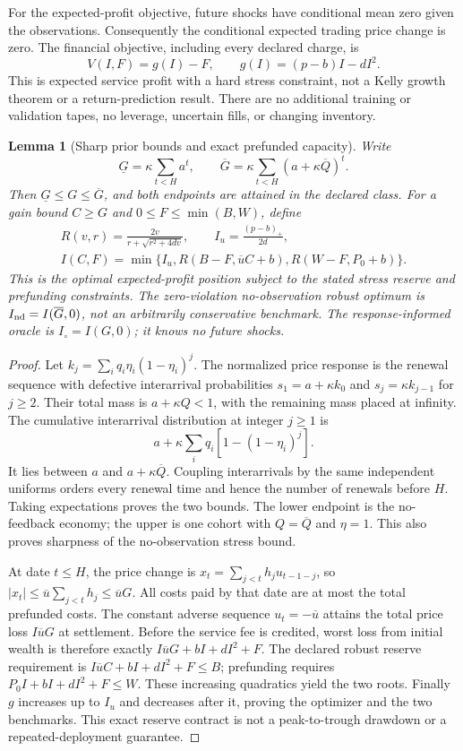 \documentclass[12pt]{article}
\newtheorem{lemma}[theorem]{Lemma}
\theoremstyle{definition}
\theoremstyle{remark}
\begin{document}
For the expected-profit objective, future shocks have conditional mean zero
given the observations. Consequently the conditional expected trading price
change is zero. The financial objective, including every declared charge, is
\[
 V(I,F)=g(I)-F,\qquad g(I)=(p-b)I-dI^2.
\]
This is expected service profit with a hard stress constraint, not a Kelly
growth theorem or a return-prediction result. There are no additional training
or validation tapes, no leverage, uncertain fills, or changing inventory.

\begin{lemma}[Sharp prior bounds and exact prefunded capacity]\label{fhc:capacity}
Write
\[
 \underline G=\kappa\sum_{t<H}a^t,\qquad
 \overline G=\kappa\sum_{t<H}(a+\kappa\overline Q)^t.
\]
Then $\underline G\le G\le\overline G$, and both endpoints are attained
in the declared class. For a gain bound $C\ge G$ and
$0\le F\le\min(B,W)$, define
\[
 \begin{gathered}
 R(v,r)=\frac{2v}{r+\sqrt{r^2+4dv}},\qquad I_u=\frac{(p-b)_+}{2d},\\
 I(C,F)=\min\{I_u,R(B-F,\overline u C+b),R(W-F,P_0+b)\}.
 \end{gathered}
\]
This is the optimal expected-profit position subject to the stated stress
reserve and prefunding constraints. The zero-violation no-observation robust optimum is
$I_{\rm nd}=I(\overline G,0)$, not an arbitrarily conservative benchmark.
The response-informed oracle is $I_\circ=I(G,0)$; it knows no future shocks.
\end{lemma}

\begin{proof}
Let $k_j=\sum_iq_i\eta_i(1-\eta_i)^j$. The normalized price response is
the renewal sequence with defective interarrival probabilities
$s_1=a+\kappa k_0$ and $s_j=\kappa k_{j-1}$ for $j\ge2$.
Their total mass is $a+\kappa Q<1$, with the remaining mass placed at
infinity. The cumulative interarrival distribution at integer $j\ge1$ is
\[
 a+\kappa\sum_iq_i[1-(1-\eta_i)^j].
\]
It lies between $a$ and $a+\kappa\overline Q$. Coupling interarrivals by
the same independent uniforms orders every renewal time and hence the
number of renewals before $H$. Taking expectations proves the two bounds.
The lower endpoint is the no-feedback economy; the upper is one cohort
with $Q=\overline Q$ and $\eta=1$. This also proves sharpness of the
no-observation stress bound.

At date $t\le H$, the price change is
$x_t=\sum_{j<t}h_j u_{t-1-j}$, so
$|x_t|\le\overline u\sum_{j<t}h_j\le\overline uG$.
All costs paid by that date are at most the total prefunded costs.
The constant adverse sequence $u_t=-\overline u$ attains the total price
loss $I\overline uG$ at settlement. Before the service fee is credited,
worst loss from initial wealth is therefore exactly
$I\overline uG+bI+dI^2+F$. The declared robust reserve requirement is
$I\overline uC+bI+dI^2+F\le B$; prefunding requires
$P_0I+bI+dI^2+F\le W$. These increasing quadratics yield the two roots.
Finally $g$ increases up to $I_u$ and decreases after it, proving the
optimizer and the two benchmarks. This exact reserve contract is not a
peak-to-trough drawdown or a repeated-deployment guarantee.
\end{proof}
\end{document}
